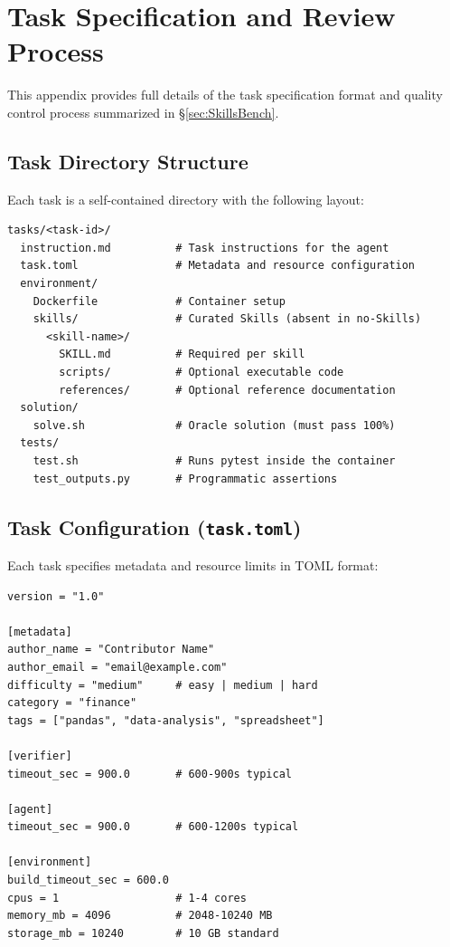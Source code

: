 \section{Task Specification and Review Process}
\label{app:task-spec}

This appendix provides full details of the task specification format and quality control process summarized in \S\ref{sec:SkillsBench}.

\subsection{Task Directory Structure}

Each task is a self-contained directory with the following layout:

\begin{lstlisting}[basicstyle=\footnotesize\ttfamily]
tasks/<task-id>/
  instruction.md          # Task instructions for the agent
  task.toml               # Metadata and resource configuration
  environment/
    Dockerfile            # Container setup
    skills/               # Curated Skills (absent in no-Skills)
      <skill-name>/
        SKILL.md          # Required per skill
        scripts/          # Optional executable code
        references/       # Optional reference documentation
  solution/
    solve.sh              # Oracle solution (must pass 100%)
  tests/
    test.sh               # Runs pytest inside the container
    test_outputs.py       # Programmatic assertions
\end{lstlisting}

\subsection{Task Configuration (\texttt{task.toml})}

Each task specifies metadata and resource limits in TOML format:

\begin{lstlisting}[basicstyle=\footnotesize\ttfamily]
version = "1.0"

[metadata]
author_name = "Contributor Name"
author_email = "email@example.com"
difficulty = "medium"     # easy | medium | hard
category = "finance"
tags = ["pandas", "data-analysis", "spreadsheet"]

[verifier]
timeout_sec = 900.0       # 600-900s typical

[agent]
timeout_sec = 900.0       # 600-1200s typical

[environment]
build_timeout_sec = 600.0
cpus = 1                  # 1-4 cores
memory_mb = 4096          # 2048-10240 MB
storage_mb = 10240        # 10 GB standard
\end{lstlisting}

